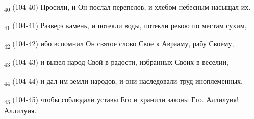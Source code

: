\begin{tcolorbox}
\textsubscript{40} (104-40) Просили, и Он послал перепелов, и хлебом небесным насыщал их.
\end{tcolorbox}
\begin{tcolorbox}
\textsubscript{41} (104-41) Разверз камень, и потекли воды, потекли рекою по местам сухим,
\end{tcolorbox}
\begin{tcolorbox}
\textsubscript{42} (104-42) ибо вспомнил Он святое слово Свое к Аврааму, рабу Своему,
\end{tcolorbox}
\begin{tcolorbox}
\textsubscript{43} (104-43) и вывел народ Свой в радости, избранных Своих в веселии,
\end{tcolorbox}
\begin{tcolorbox}
\textsubscript{44} (104-44) и дал им земли народов, и они наследовали труд иноплеменных,
\end{tcolorbox}
\begin{tcolorbox}
\textsubscript{45} (104-45) чтобы соблюдали уставы Его и хранили законы Его. Аллилуия! Аллилуия.
\end{tcolorbox}
